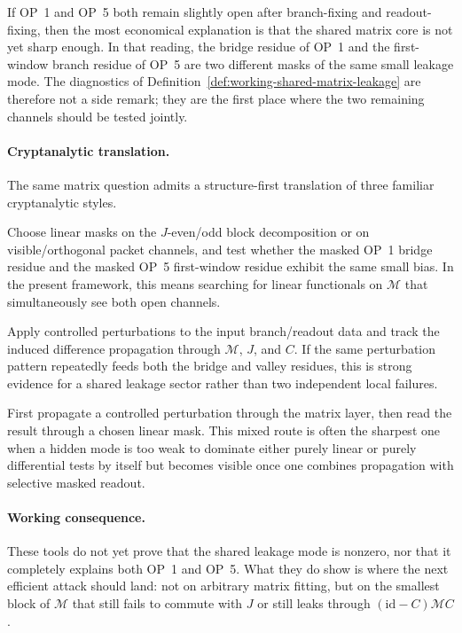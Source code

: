\begin{remark}
\label{rem:working-op1-op5-coupling-heuristic}
If OP~1 and OP~5 both remain slightly open after branch-fixing and readout-fixing, then the most economical explanation is that the shared matrix core is not yet sharp enough. In that reading, the bridge residue of OP~1 and the first-window branch residue of OP~5 are two different masks of the same small leakage mode. The diagnostics of Definition~\ref{def:working-shared-matrix-leakage} are therefore not a side remark; they are the first place where the two remaining channels should be tested jointly.
\end{remark}

\paragraph{Cryptanalytic translation.}
The same matrix question admits a structure-first translation of three familiar cryptanalytic styles.
\begin{description}[leftmargin=2.2em, labelindent=0pt, itemsep=0.5em]
  \item[Linear route.] Choose linear masks on the \(J\)-even/odd block decomposition or on visible/orthogonal packet channels, and test whether the masked OP~1 bridge residue and the masked OP~5 first-window residue exhibit the same small bias. In the present framework, this means searching for linear functionals on \(\mathcal M\) that simultaneously see both open channels.
  \item[Differential route.] Apply controlled perturbations to the input branch/readout data and track the induced difference propagation through \(\mathcal M\), \(J\), and \(C\). If the same perturbation pattern repeatedly feeds both the bridge and valley residues, this is strong evidence for a shared leakage sector rather than two independent local failures.
  \item[Linear-differential route.] First propagate a controlled perturbation through the matrix layer, then read the result through a chosen linear mask. This mixed route is often the sharpest one when a hidden mode is too weak to dominate either purely linear or purely differential tests by itself but becomes visible once one combines propagation with selective masked readout.
\end{description}

\paragraph{Working consequence.}
These tools do not yet prove that the shared leakage mode is nonzero, nor that it completely explains both OP~1 and OP~5. What they do show is where the next efficient attack should land: not on arbitrary matrix fitting, but on the smallest block of \(\mathcal M\) that still fails to commute with \(J\) or still leaks through \((\mathrm{id}-C)\mathcal M C\).


